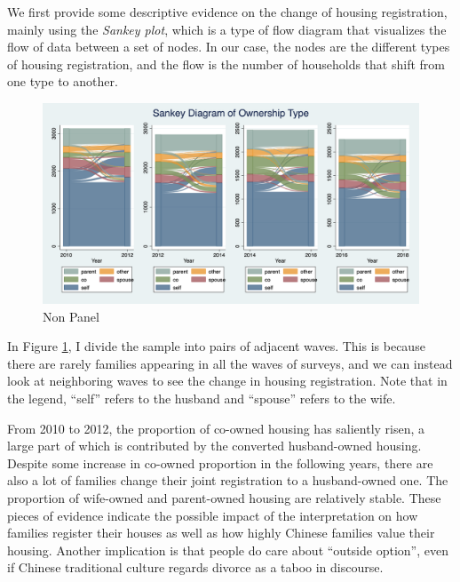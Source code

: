 \documentclass[11pt]{article}
\begin{document}
We first provide some descriptive evidence on the change of housing registration, mainly using the \textit{Sankey plot}, which is a type of flow diagram that visualizes the flow of data between a set of nodes. In our case, the nodes are the different types of housing registration, and the flow is the number of households that shift from one type to another.

\begin{figure}
    \centering
    \includegraphics[width = \textwidth]{./graphs_new/sankeyall_nonpanel.png}
    \caption{Non Panel}
    \label{fig:sankeyall_nonpanel}
\end{figure}

In Figure \ref{fig:sankeyall_nonpanel}, I divide the sample into pairs of adjacent waves. This is because there are rarely families appearing in all the waves of surveys, and we can instead look at neighboring waves to see the change in housing registration. Note that in the legend, ``self'' refers to the husband and ``spouse'' refers to the wife.

From 2010 to 2012, the proportion of co-owned housing has saliently risen, a large part of which is contributed by the converted husband-owned housing. Despite some increase in co-owned proportion in the following years, there are also a lot of families change their joint registration to a husband-owned one. The proportion of wife-owned and parent-owned housing are relatively stable. These pieces of evidence indicate the possible impact of the interpretation on how families register their houses as well as how highly Chinese families value their housing. Another implication is that people do care about ``outside option'', even if Chinese traditional culture regards divorce as a taboo in discourse.
\end{document}
